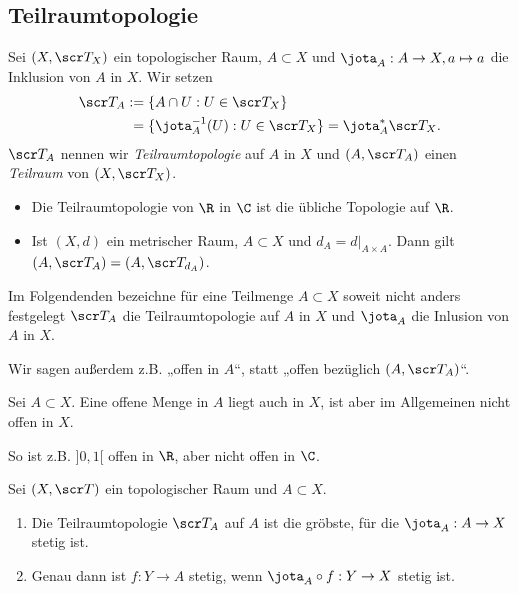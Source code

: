 \subsection{Teilraumtopologie}

\begin{df}
	Sei $(X, \scr T_X)$ ein topologischer Raum, $A \subset X$ und $\jota_A: A \to X, a \mapsto a$ die Inklusion von $A$ in $X$.
	Wir setzen
	\begin{align*}
		\scr T_A
		&:= \{ A \cap U : U \in \scr T_X \} \\
		&\;= \{ \jota_A^{-1}(U) : U \in \scr T_X \}
		= \jota_A^* \scr T_X.
	\end{align*}
	$\scr T_A$ nennen wir \emph{Teilraumtopologie} auf $A$ in $X$ und $(A, \scr T_A)$ einen \emph{Teilraum} von $(X, \scr T_X)$.
\end{df}

\begin{ex}
	\begin{itemize}
		\item
			Die Teilraumtopologie von $\R$ in $\C$ ist die übliche Topologie auf $\R$.
		\item
			Ist $(X, d)$ ein metrischer Raum, $A \subset X$ und $d_A = d|_{A\times A}$.
			Dann gilt $(A, \scr T_A) = (A, \scr T_{d_A})$.
	\end{itemize}
\end{ex}

\begin{conv}
	Im Folgendenden bezeichne für eine Teilmenge $A \subset X$ soweit nicht anders festgelegt $\scr T_A$ die Teilraumtopologie auf $A$ in $X$ und $\jota_A$ die Inlusion von $A$ in $X$.

	Wir sagen außerdem z.B. „offen in $A$“, statt „offen bezüglich $(A, \scr T_A)$“.
\end{conv}

\begin{nt}
	Sei $A \subset X$.
	Eine offene Menge in $A$ liegt auch in $X$, ist aber im Allgemeinen nicht offen in $X$.

	So ist z.B. $]0,1[$ offen in $\R$, aber nicht offen in $\C$.
\end{nt}

\begin{st}
	Sei $(X, \scr T)$ ein topologischer Raum und $A \subset X$.
	\begin{enumerate}[(1)]
		\item
			Die Teilraumtopologie $\scr T_A$ auf $A$ ist die gröbste, für die $\jota_A : A \to X$ stetig ist.
		\item
			Genau dann ist $f: Y \to A$ stetig, wenn $\jota_A \circ f: Y \to X$ stetig ist.
	\end{enumerate}
\end{st}

